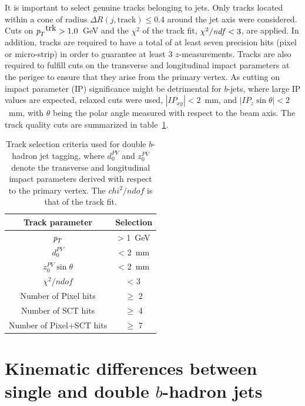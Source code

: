  It is important to select genuine tracks belonging to jets. Only tracks located  within a cone of radius $\Delta R(j,\mbox{track}) \leq 0.4$ around the jet axis were considered. %
  Cuts on ${\emph{p}_{T}}^{\mbox{trk}}>1.0$~GeV and the $\chi^2$ of the track fit, $\chi^2/{\it ndf}<3$, are applied. %
 In addition, tracks are required to have a total of at least seven precision hits (pixel or micro-strip) in order to guarantee at least 3 $z$-measurements. Tracks are also required to fulfill cuts on the transverse and longitudinal impact parameters at the perigee to ensure that they arise from  the primary vertex. As cutting on impact parameter (IP) significance might be detrimental for $b$-jets, where large IP values are expected, relaxed cuts were used, $|IP_{xy}|<2$~mm, and $|IP_{z}\sin\theta|<2$~mm, with $\theta$ being the polar angle measured with respect to the beam axis. The track quality cuts are summarized in table~\ref{tb:tracks}. %


\begin{table}[!hbt] %
\renewcommand{\arraystretch}{1.2}
\centering
\begin{tabular}{ c  c  }
  \hline
  Track parameter &  Selection \\ \hline
  ${\emph{p}_{T}}$   &   > 1~GeV \\
  $d_0^{PV}$   &   < 2~mm \\
  $z_0^{PV}\sin \theta$   &   < 2~mm \\
  $\chi^2 /ndof$   &   < 3 \\
  Number of Pixel hits   &  $\geq$ 2 \\
  Number of SCT hits   &   $\geq$ 4 \\
  Number of Pixel+SCT hits   &  $\geq$ 7 \\ \hline
\end{tabular}
\caption{Track selection criteria used for double $b$-hadron jet tagging, where $d_0^{PV}$ and $z_0^{PV}$ denote the transverse and longitudinal impact parameters derived with respect to the primary vertex. The $chi^2 / ndof$ is that of the track fit.}
\label{tb:tracks}
\end{table}




\section{Kinematic differences between single and double $b$-hadron jets}\label{sec:gbbKine}

